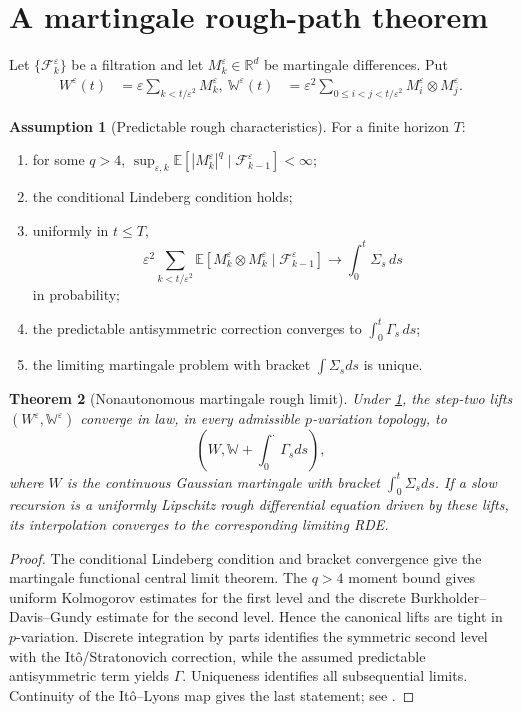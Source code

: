 \documentclass[11pt,reqno]{amsart}
\newtheorem{theorem}{Theorem}[section]
\theoremstyle{definition}
\newtheorem{assumption}[theorem]{Assumption}
\theoremstyle{remark}
\newcommand{\E}{\mathbb E}
\newcommand{\R}{\mathbb R}
\newcommand{\abs}[1]{\left\lvert #1\right\rvert}
\begin{document}
\section{A martingale rough-path theorem}\label{sec:martingale}

Let $\{\mathcal F_k^\varepsilon\}$ be a filtration and let
$M_k^\varepsilon\in\R^d$ be martingale differences.  Put
\begin{align}
 W^\varepsilon(t)&=\varepsilon
   \sum_{k<t/\varepsilon^2}M_k^\varepsilon,
 \label{eq:W}\
 \mathbb W^\varepsilon(t)&=\varepsilon^2
   \sum_{0\le i<j<t/\varepsilon^2}
   M_i^\varepsilon\otimes M_j^\varepsilon.
 \label{eq:WW}
\end{align}

\begin{assumption}[Predictable rough characteristics]\label{ass:chars}
For a finite horizon $T$:
\begin{enumerate}[label=(\roman*)]
\item for some $q>4$,
$\sup_{\varepsilon,k}\E[\abs{M_k^\varepsilon}^q\mid
\mathcal F_{k-1}^\varepsilon]<\infty$;
\item the conditional Lindeberg condition holds;
\item uniformly in $t\le T$,
\[
 \varepsilon^2\sum_{k<t/\varepsilon^2}
 \E[M_k^\varepsilon\otimes M_k^\varepsilon\mid
 \mathcal F_{k-1}^\varepsilon]
 \longrightarrow\int_0^t\Sigma_s\,ds
\]
in probability;
\item the predictable antisymmetric correction converges to
$\int_0^t\Gamma_s\,ds$;
\item the limiting martingale problem with bracket $\int\Sigma_sds$ is
unique.
\end{enumerate}
\end{assumption}

\begin{theorem}[Nonautonomous martingale rough limit]\label{thm:rough}
Under \cref{ass:chars}, the step-two lifts
$(W^\varepsilon,\mathbb W^\varepsilon)$ converge in law, in every admissible
$p$-variation topology, to
\[
 (W,\mathbb W+\textstyle\int_0^{\cdot}\Gamma_sds),
\]
where $W$ is the continuous Gaussian martingale with bracket
$\int_0^t\Sigma_sds$.  If a slow recursion is a uniformly Lipschitz rough
differential equation driven by these lifts, its interpolation converges to
the corresponding limiting RDE.
\end{theorem}

\begin{proof}
The conditional Lindeberg condition and bracket convergence give the
martingale functional central limit theorem.  The $q>4$ moment bound gives
uniform Kolmogorov estimates for the first level and the discrete
Burkholder--Davis--Gundy estimate for the second level.  Hence the canonical
lifts are tight in $p$-variation.  Discrete integration by parts identifies
the symmetric second level with the It\^o/Stratonovich correction, while the
assumed predictable antisymmetric term yields $\Gamma$.  Uniqueness identifies
all subsequential limits.  Continuity of the It\^o--Lyons map gives the last
statement; see \cite{FrizVictoir2010,FrizHairer2014}.
\end{proof}
\end{document}
